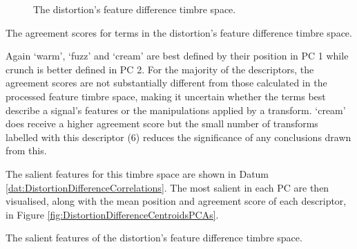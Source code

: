\begin{figure}[h!]
{					\label{fig:DistortionDifferencePCA3-2}
				}
				\caption{The distortion's feature difference timbre space.}
				\label{fig:DistortionDifferencePCAs}
			\end{figure}

			\begin{table}[h!]
				\centering
				
				\centering
				\caption{The agreement scores for terms in the 
					 distortion's feature difference timbre space.}
				\label{tab:DistortionDifferenceAgreements}
			\end{table}

			Again `warm', `fuzz' and `cream' are best defined by their position in PC 1 while crunch is better
			defined in PC 2. For the majority of the descriptors, the agreement scores are not substantially
			different from those calculated in the processed feature timbre space, making it uncertain whether
			the terms best describe a signal's features or the manipulations applied by a transform. `cream'
			does receive a higher agreement score but the small number of transforms labelled with this
			descriptor (6) reduces the significance of any conclusions drawn from this.

			The salient features for this timbre space are shown in Datum
			\ref{dat:DistortionDifferenceCorrelations}. The most salient in each PC are then visualised, along
			with the mean position and agreement score of each descriptor, in Figure
			\ref{fig:DistortionDifferenceCentroidsPCAs}. 

			\begin{datum}[h!]
				\centering
				\begin{minipage}{0.9\textwidth}
					
				\end{minipage}
				\caption{The salient features of the distortion's
					 feature difference timbre space.}
				\label{dat:DistortionDifferenceCorrelations}
			\end{datum}

